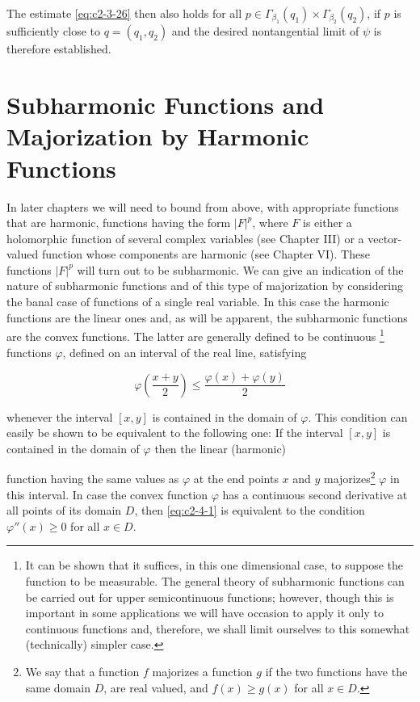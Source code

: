 The estimate \eqref{eq:c2-3-26} then also holds for all $p \in \Gamma_{\beta_1}(q_1) \times \Gamma_{\beta_2}(q_2)$, if $p$ is sufficiently close to $q = (q_1, q_2)$ and the desired nontangential limit of $\psi$ is therefore established.

\section{Subharmonic Functions and Majorization by Harmonic Functions}

In later chapters we will need to bound from above, with appropriate functions that are harmonic, functions having the form $|F|^p$, where $F$ is either a holomorphic function of several complex variables (see Chapter III) or a vector-valued function whose components are harmonic (see Chapter VI). These functions $|F|^p$ will turn out to be subharmonic. We can give an indication of the nature of subharmonic functions and of this type of majorization by considering the banal case of functions of a single real variable. In this case the harmonic functions are the linear ones and, as will be apparent, the subharmonic functions are the convex functions. The latter are generally defined to be continuous \footnote{It can be shown that it suffices, in this one dimensional case, to suppose the function to be measurable. The general theory of subharmonic functions can be carried out for upper semicontinuous functions; however, though this is important in some applications we will have occasion to apply it only to continuous functions and, therefore, we shall limit ourselves to this somewhat (technically) simpler case.} functions $\varphi$, defined on an interval of the real line, satisfying

\begin{equation}\label{eq:c2-4-1}
\varphi\left(\frac{x+y}{2}\right)\leq\frac{\varphi(x)+\varphi(y)}{2}
\end{equation}

whenever the interval $[x, y]$ is contained in the domain of $\varphi$. This condition can easily be shown to be equivalent to the following one: If the interval $[x, y]$ is contained in the domain of $\varphi$ then the linear (harmonic)

function having the same values as $\varphi$ at the end points $x$ and $y$ majorizes\footnote{We say that a function $f$ majorizes a function $g$ if the two functions have the same domain $D$, are real valued, and $f(x) \geq g(x)$ for all $x \in D$.} $\varphi$ in this interval. In case the convex function $\varphi$ has a continuous second derivative at all points of its domain $D$, then \eqref{eq:c2-4-1} is equivalent to the condition $\varphi''(x) \geq 0$ for all $x \in D$.

